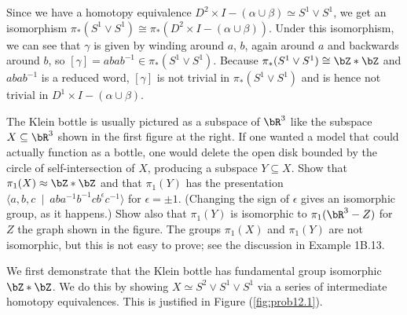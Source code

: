 \begin{homework}[e]
\begin{prf}
    Since we have a homotopy equivalence $D^2 \times I - (\alpha \cup \beta) \simeq S^1 \vee S^1$, we get an isomorphism $\pi_*(S^1\vee S^1) \cong \pi_*(D^2 \times I - (\alpha \cup \beta))$. Under this isomorphism, we can see that $\gamma$ is given by winding around $a$, $b$, again around $a$ and backwards around $b$, so $[\gamma] = abab^{-1} \in \pi_*(S^1\vee S^1)$. Because $\pi_*(S^1\vee S^1) \cong \bZ\ast \bZ$ and $abab^{-1}$ is a reduced word, $[\gamma]$ is not trivial in $\pi_*(S^1\vee S^1)$ and is hence not trivial in $D^1\times I - (\alpha \cup \beta)$.
  \end{prf}
   The Klein bottle is usually pictured as a subspace of $\bR^3$ like the subspace $X \subseteq \bR^3$ shown in the first figure at the right. If one wanted a model that could actually function as a bottle, one would delete the open disk bounded by the circle of self-intersection of $X$, producing a subspace $Y \subseteq X$. Show that $\pi_1(X)\approx \bZ\ast \bZ$ and that $\pi_1(Y)$ has the presentation $\langle a,b,c ~\mid ~ aba^{-1}b^{-1}cb^\epsilon c^{-1} \rangle$ for $\epsilon = \pm 1$. (Changing the sign of $\epsilon$ gives an isomorphic group, as it happens.) Show also that $\pi_1(Y)$ is isomorphic to $\pi_1(\bR^3 - Z)$ for $Z$ the graph shown in the figure. The groups $\pi_1(X)$ and $\pi_1(Y)$ are not isomorphic, but this is not easy to prove; see the discussion in Example 1B.13.
  \begin{prf}
    We first demonstrate that the Klein bottle has fundamental group isomorphic $\bZ\ast \bZ$. We do this by showing $X \simeq S^2 \vee S^1 \vee S^1$ via a series of intermediate homotopy equivalences. This is justified in Figure (\ref{fig:prob12.1}).
    \begin{center}

\end{center}
\end{prf}
\end{homework}
